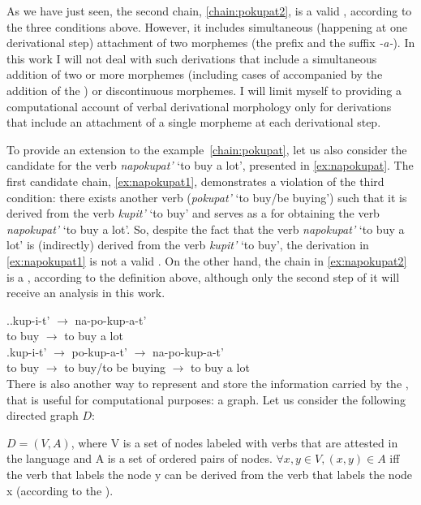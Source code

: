 As we have just seen, the second chain, \ref{chain:pokupat2}, is a valid , according to the three conditions above. However, it includes simultaneous (happening at one derivational step) attachment of two morphemes (the prefix  and the suffix \textit{-a-}). In this work I will not deal with such derivations that include a simultaneous addition of two or more morphemes (including cases of  accompanied by the addition of the ) or discontinuous morphemes. I will limit myself to providing a computational account of verbal derivational morphology only for derivations that include an attachment of a single morpheme at each derivational step.

To provide an extension to the example~\ref{chain:pokupat}, let us also consider the candidate  for the verb \textit{napokupat'} `to buy a lot', presented in \ref{ex:napokupat}. The first candidate chain, \ref{ex:napokupat1}, demonstrates a violation of the third condition: there exists another verb (\textit{pokupat'} `to buy/be buying') such that it is derived from the verb \textit{kupit'} `to buy' and serves as a  for obtaining the verb \textit{napokupat'} `to buy a lot'. So, despite the fact that the verb \textit{napokupat'} `to buy a lot' is (indirectly) derived from the verb \textit{kupit'} `to buy', the derivation in \ref{ex:napokupat1} is not a valid . On the other hand, the chain in \ref{ex:napokupat2} is a , according to the definition above, although only the second step of it will receive an analysis in this work. 

\ex.\label{ex:napokupat}\ag.\label{ex:napokupat1}kup-i-t'\textsuperscript{\PF} $\rightarrow$ na-po-kup-a-t'\textsuperscript{\PF}\\	
{to buy} $\rightarrow$ {to buy a lot}\\
\bg.\label{ex:napokupat2}kup-i-t'\textsuperscript{\PF} $\rightarrow$ po-kup-a-t'\textsuperscript{\IPF} $\rightarrow$ na-po-kup-a-t'\textsuperscript{\PF}\\
{to buy} $\rightarrow$ {to buy/to be buying} $\rightarrow$ {to buy a lot}\\

There is also another way to represent and store the information carried by the , that is useful for computational purposes: a graph. Let us consider the following directed graph $D$: 
\begin{definition}\label{def:chain}
$D = (V,A)$, where V is a set of nodes labeled with verbs that are attested in the language and A is a set of ordered pairs of nodes. $\forall x,y \in V, (x,y) \in A$ iff  the verb that labels the node y can be derived from the verb that labels the node x (according to the ).
\end{definition}

